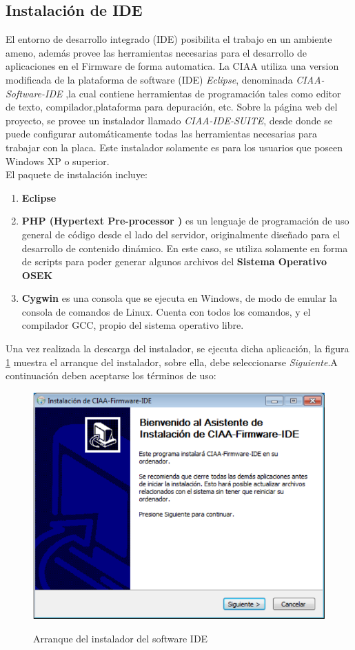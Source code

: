 \documentclass[12pt,letterpaper]{article}
\begin{document}
\subsection{Instalación de IDE}
El entorno de desarrollo integrado (IDE) posibilita el trabajo en un ambiente ameno, además provee las herramientas necesarias para el desarrollo de aplicaciones en el Firmware de forma automatica. La CIAA utiliza una version modificada de la plataforma de software (IDE)  \textit{Eclipse}, denominada \textit{CIAA-Software-IDE} ,la cual contiene herramientas de programación tales como editor de texto, compilador,plataforma para depuración, etc.
Sobre la página web del proyecto, se provee un instalador llamado \textit{CIAA-IDE-SUITE}, desde donde se puede configurar automáticamente todas las herramientas necesarias para trabajar con la placa. Este instalador solamente es para los usuarios que poseen Windows XP o superior.
 \\

El paquete de instalación incluye:
\begin{enumerate}
\item \textbf{Eclipse}
\item\textbf{PHP (Hypertext Pre-processor )} es un lenguaje de programación de uso general de código desde el lado del servidor, originalmente diseñado para el desarrollo de contenido dinámico. En este caso, se utiliza solamente en forma de scripts para poder generar algunos archivos del \textbf{Sistema Operativo OSEK}
\item \textbf{Cygwin} es una consola que se ejecuta en Windows, de modo de emular la consola de comandos de Linux. Cuenta con todos los comandos, y el compilador GCC, propio del sistema operativo libre.
\end{enumerate}

Una vez realizada la descarga del instalador, se ejecuta dicha aplicación, la figura \ref{Fig4} muestra el arranque del instalador, sobre ella, debe seleccionarse \textit{Siguiente}.A continuación deben aceptarse los términos de uso: 

\begin{figure}[!h]
\centering
\includegraphics[width=8 cm]{figuras/instalacion1.png}\\
\caption{Arranque del instalador del software IDE}
\label{Fig4}
\end{figure}
\end{document}
